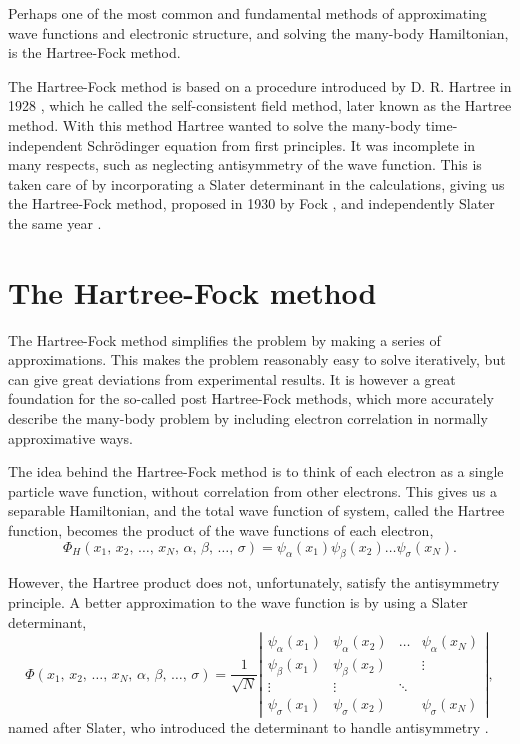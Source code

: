 
Perhaps one of the most common and fundamental methods of
approximating wave functions and electronic structure, and solving the
many-body Hamiltonian, is the Hartree-Fock method.

The Hartree-Fock method is based on a procedure introduced by
D. R. Hartree in 1928 \cite{hartree28}, which he called the
self-consistent field method, later known as the Hartree method. With
this method Hartree wanted to solve the many-body time-independent
Schrödinger equation from first principles. 
It was incomplete in many respects, such as neglecting
antisymmetry of the wave function. This is taken care of by
incorporating a Slater determinant in the calculations, giving us the
Hartree-Fock method, proposed in 1930 by Fock \cite{fock1930}, and
independently Slater the same year \cite{slater1930}.

\section{The Hartree-Fock method} \label{sec:HF_method}

	The Hartree-Fock method simplifies the problem by making a
	series of approximations. This makes the problem reasonably
	easy to solve iteratively, but can give great deviations from
	experimental results. It is however a great foundation for the
	so-called post Hartree-Fock methods, which more accurately
	describe the many-body problem by including electron
	correlation in normally approximative ways.

	The idea behind the Hartree-Fock method is to think of each
	electron as a single particle wave function, without
	correlation from other electrons. This gives us a separable
	Hamiltonian, and the total wave function of system, called the
	Hartree function, becomes the product of the wave functions of
	each electron, \[ \Phi_{H}\left(x_{1},\, x_{2},\,\dots,\,
	x_{N},\,\alpha,\,\beta,\,\dots,\,\sigma\right)=\psi_{\alpha}\left(x_{1}\right)\psi_{\beta}\left(x_{2}\right)\dots\psi_{\sigma}\left(x_{N}\right).  \]

	However, the Hartree product does not, unfortunately, satisfy the antisymmetry principle. A better approximation to the wave function is by using a Slater determinant,
	\begin{equation} \label{eq:HF_slater_determinant}
	\Phi\left(x_{1},\, x_{2},\,\dots,\, x_{N},\,\alpha,\,\beta,\,\dots,\,\sigma\right)=\frac{1}{\sqrt{N}}\left|\begin{array}{cccc}
	\psi_{\alpha}\left(x_{1}\right) & \psi_{\alpha}\left(x_{2}\right) & \dots & \psi_{\alpha}\left(x_{N}\right)\\
	\psi_{\beta}\left(x_{1}\right) & \psi_{\beta}\left(x_{2}\right) &  & \vdots\\
	\vdots & \vdots & \ddots\\
	\psi_{\sigma}\left(x_{1}\right) & \psi_{\sigma}\left(x_{2}\right) &  & \psi_{\sigma}\left(x_{N}\right)
	\end{array}\right|,
	\end{equation}
	named after Slater, who introduced the determinant to handle antisymmetry \cite{slater1929}.

